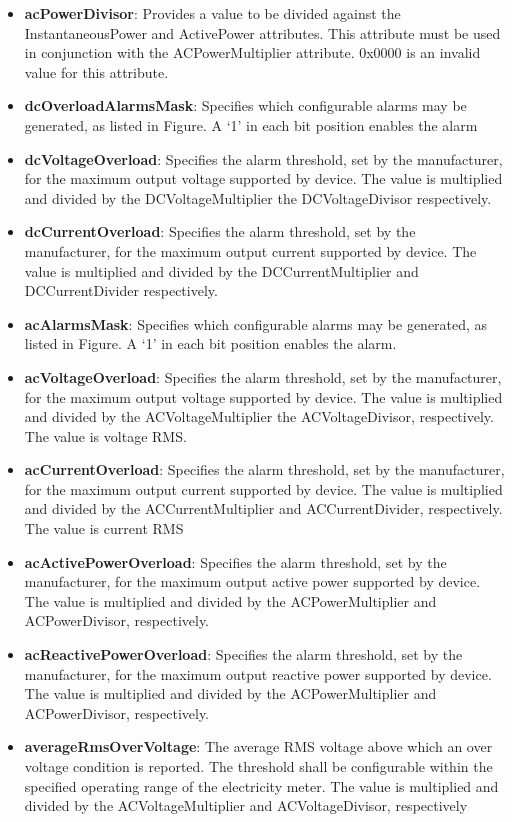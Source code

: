 \begin{itemize}
\item \textbf{acPowerDivisor}: Provides a value to be divided against the InstantaneousPower and ActivePower attributes. This attribute must be used in conjunction with the ACPowerMultiplier attribute. 0x0000 is an invalid value for this attribute.
\item \textbf{dcOverloadAlarmsMask}: Specifies which configurable alarms may be generated, as listed in Figure. A ‘1’ in each bit position enables the alarm
\item \textbf{dcVoltageOverload}: Specifies the alarm threshold, set by the manufacturer, for the maximum output voltage supported by device. The value is multiplied and divided by the DCVoltageMultiplier the DCVoltageDivisor respectively.
\item \textbf{dcCurrentOverload}: Specifies the alarm threshold, set by the manufacturer, for the maximum output current supported by device. The value is multiplied and divided by the DCCurrentMultiplier and DCCurrentDivider respectively.
\item \textbf{acAlarmsMask}: Specifies which configurable alarms may be generated, as listed in Figure. A ‘1’ in each bit position enables the alarm.
\item \textbf{acVoltageOverload}: Specifies the alarm threshold, set by the manufacturer, for the maximum output voltage supported by device. The value is multiplied and divided by the ACVoltageMultiplier the ACVoltageDivisor, respectively. The value is voltage RMS.
\item \textbf{acCurrentOverload}: Specifies the alarm threshold, set by the manufacturer, for the maximum output current supported by device. The value is multiplied and divided by the ACCurrentMultiplier and ACCurrentDivider, respectively. The value is current RMS
\item \textbf{acActivePowerOverload}: Specifies the alarm threshold, set by the manufacturer, for the maximum output active power supported by device. The value is multiplied and divided by the ACPowerMultiplier and ACPowerDivisor, respectively.
\item \textbf{acReactivePowerOverload}: Specifies the alarm threshold, set by the manufacturer, for the maximum output reactive power supported by device. The value is multiplied and divided by the ACPowerMultiplier and ACPowerDivisor, respectively.
\item \textbf{averageRmsOverVoltage}: The average RMS voltage above which an over voltage condition is reported. The threshold shall be configurable within the specified operating range of the electricity meter. The value is multiplied and divided by the ACVoltageMultiplier and ACVoltageDivisor, respectively

\end{itemize}
